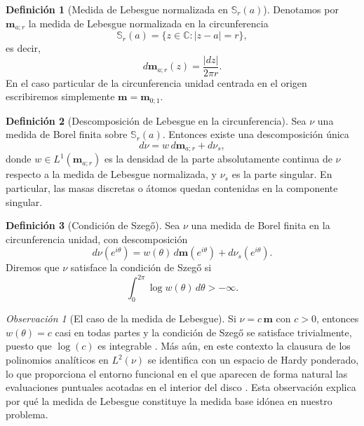 \documentclass[12pt,a4paper]{article}
\theoremstyle{definition}
\newtheorem{definition}{Definición}
\theoremstyle{remark}
\newtheorem{remark}{Observación}
\newcommand{\C}{\mathbb{C}}
\newcommand{\abs}[1]{\left| #1 \right|}
\begin{document}
\begin{definition}[Medida de Lebesgue normalizada en $\mathbb{S}_r(a)$]
	Denotamos por $\mathbf{m}_{a;r}$ la medida de Lebesgue normalizada en la circunferencia
	$$\mathbb{S}_r(a) = \{z \in \C : \abs{z-a} = r\},$$
	es decir,
	\begin{equation}
		d\mathbf{m}_{a;r}(z) = \frac{\abs{dz}}{2\pi r}.
	\end{equation}
	En el caso particular de la circunferencia unidad centrada en el origen escribiremos simplemente $\mathbf{m} = \mathbf{m}_{0;1}$.
\end{definition}

\begin{definition}[Descomposición de Lebesgue en la circunferencia]
	Sea $\nu$ una medida de Borel finita sobre $\mathbb{S}_r(a)$. Entonces existe una descomposición única
	\begin{equation}
		d\nu = w\, d\mathbf{m}_{a;r} + d\nu_s,
	\end{equation}
	donde $w \in L^1(\mathbf{m}_{a;r})$ es la densidad de la parte absolutamente continua de $\nu$ respecto a la medida de Lebesgue normalizada, y $\nu_s$ es la parte singular. En particular, las masas discretas o átomos quedan contenidas en la componente singular.
\end{definition}

\begin{definition}[Condición de Szegő]
	Sea $\nu$ una medida de Borel finita en la circunferencia unidad, con descomposición
	\begin{equation}
		d\nu(e^{i\theta}) = w(\theta)\, d\mathbf{m}(e^{i\theta}) + d\nu_s(e^{i\theta}).
	\end{equation}
	Diremos que $\nu$ satisface la condición de Szegő si
	\begin{equation}
		\int_0^{2\pi} \log w(\theta)\, d\theta > -\infty.
	\end{equation}
\end{definition}

\begin{remark}[El caso de la medida de Lebesgue]
	Si $\nu = c\,\mathbf{m}$ con $c>0$, entonces $w(\theta)=c$ casi en todas partes y la condición de Szegő se satisface trivialmente, puesto que $\log(c)$ es integrable \cite{szego1975orthogonal}. Más aún, en este contexto la clausura de los polinomios analíticos en $L^2(\nu)$ se identifica con un espacio de Hardy ponderado, lo que proporciona el entorno funcional en el que aparecen de forma natural las evaluaciones puntuales acotadas en el interior del disco \cite{duren1970theory}. Esta observación explica por qué la medida de Lebesgue constituye la medida base idónea en nuestro problema.
\end{remark}
\end{document}
